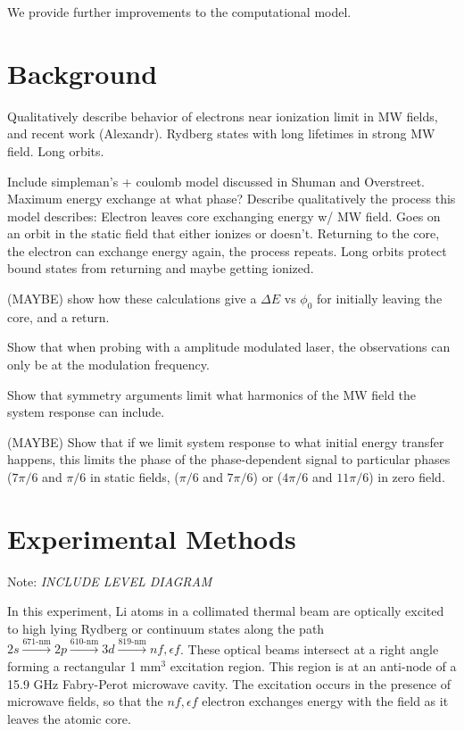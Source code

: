 \documentclass[aps,pra,preprint,groupedaddress]{revtex4-1}
\begin{document}
We provide further improvements to the computational model.


\section{Background}
\label{sec:back}

Qualitatively describe behavior of electrons near ionization limit in MW fields, and recent work (Alexandr). Rydberg states with long lifetimes in strong MW field. Long orbits.

Include simpleman's + coulomb model discussed in Shuman and Overstreet. Maximum energy exchange at what phase? Describe qualitatively the process this model describes: Electron leaves core exchanging energy w/ MW field. Goes on an orbit in the static field that either ionizes or doesn't. Returning to the core, the electron can exchange energy again, the process repeats. Long orbits protect bound states from returning and maybe getting ionized.

(MAYBE) show how these calculations give a $\Delta E$ vs $\phi_0$ for initially leaving the core, and a return.

Show that when probing with a amplitude modulated laser, the observations can only be at the modulation frequency.

Show that symmetry arguments limit what harmonics of the MW field the system response can include.

(MAYBE) Show that if we limit system response to what initial energy transfer happens, this limits the phase of the phase-dependent signal to particular phases ($7\pi/6$ and $\pi/6$ in static fields, ($\pi/6$ and $7\pi/6$) or ($4\pi/6$ and $11\pi/6$) in zero field.

\section{Experimental Methods}
\label{sec:exp}

Note: \emph{INCLUDE LEVEL DIAGRAM}

In this experiment, Li atoms in a collimated thermal beam are optically excited to high lying Rydberg or continuum states along the path $2s \xrightarrow{\text{671-nm}} 2p \xrightarrow{\text{610-nm}} 3d \xrightarrow{\text{819-nm}} nf, \epsilon f$. These optical beams intersect at a right angle forming a rectangular 1 mm$^3$ excitation region. This region is at an anti-node of a 15.9 GHz Fabry-Perot microwave cavity. The excitation occurs in the presence of microwave fields, so that the $nf, \epsilon f$ electron exchanges energy with the field as it leaves the atomic core.
\end{document}
